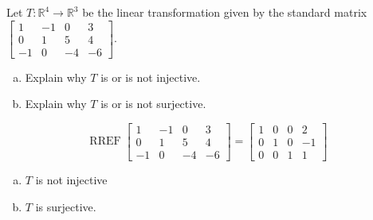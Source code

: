 
\begin{exerciseStatement}
 Let \(T:\mathbb{R}^ 4  \to \mathbb{R}^ 3 \) be the linear transformation given by the standard matrix \( \left[\begin{array}{cccc}
1 & -1 & 0 & 3 \\
0 & 1 & 5 & 4 \\
-1 & 0 & -4 & -6
\end{array}\right] .\)
\begin{enumerate}[(a)]
\item Explain why \(T\) is or is not injective.
\item Explain why \(T\) is or is not surjective.
\end{enumerate}
    
\end{exerciseStatement}
    
\begin{exerciseAnswer} 


\[\operatorname{RREF} \left[\begin{array}{cccc}
1 & -1 & 0 & 3 \\
0 & 1 & 5 & 4 \\
-1 & 0 & -4 & -6
\end{array}\right] = \left[\begin{array}{cccc}
1 & 0 & 0 & 2 \\
0 & 1 & 0 & -1 \\
0 & 0 & 1 & 1
\end{array}\right] \]


\begin{enumerate}[(a)]
\item \(T\) is not injective
\item \(T\) is surjective.
\end{enumerate}
    
\end{exerciseAnswer}
    
